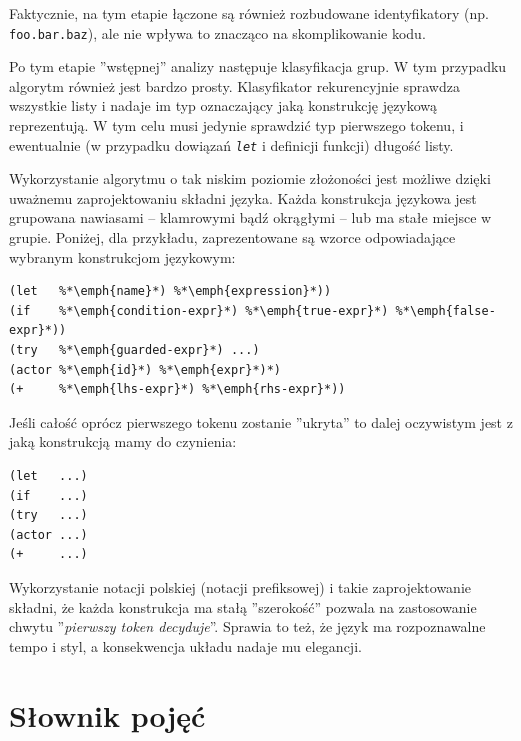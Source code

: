 \documentclass[11pt,oneside,a4paper,titlepage,onecolumn]{article}
\begin{document}
Faktycznie, na tym etapie łączone są również rozbudowane identyfikatory (np. \texttt{foo.bar.baz}), ale nie
wpływa to znacząco na skomplikowanie kodu.

Po tym etapie ''wstępnej'' analizy następuje klasyfikacja grup. W tym przypadku algorytm również jest bardzo
prosty. Klasyfikator rekurencyjnie sprawdza wszystkie listy i nadaje im typ oznaczający jaką konstrukcję
językową reprezentują. W tym celu musi jedynie sprawdzić typ pierwszego tokenu, i ewentualnie (w przypadku
dowiązań \emph{\texttt{let}} i definicji funkcji) długość listy.

Wykorzystanie algorytmu o tak niskim poziomie złożoności jest możliwe dzięki uważnemu zaprojektowaniu składni
języka. Każda konstrukcja językowa jest grupowana nawiasami -- klamrowymi bądź okrągłymi -- lub ma stałe
miejsce w grupie. Poniżej, dla przykładu, zaprezentowane są wzorce odpowiadające wybranym konstrukcjom
językowym:
\begin{lstlisting}
(let   %*\emph{name}*) %*\emph{expression}*))
(if    %*\emph{condition-expr}*) %*\emph{true-expr}*) %*\emph{false-expr}*))
(try   %*\emph{guarded-expr}*) ...)
(actor %*\emph{id}*) %*\emph{expr}*)*)
(+     %*\emph{lhs-expr}*) %*\emph{rhs-expr}*))
\end{lstlisting}

Jeśli całość oprócz pierwszego tokenu zostanie ''ukryta'' to dalej oczywistym jest z jaką konstrukcją mamy do
czynienia:
\begin{lstlisting}
(let   ...)
(if    ...)
(try   ...)
(actor ...)
(+     ...)
\end{lstlisting}

Wykorzystanie notacji polskiej (notacji prefiksowej) i takie zaprojektowanie składni, że każda konstrukcja ma
stałą ''szerokość'' pozwala na zastosowanie chwytu ''\emph{pierwszy token decyduje}''. Sprawia to też, że
język ma rozpoznawalne tempo i styl, a konsekwencja układu nadaje mu elegancji.

\newpage
\section{Słownik pojęć}
\end{document}
